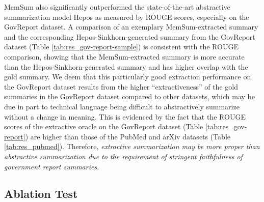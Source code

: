 \documentclass[11pt]{article}
\begin{document}
MemSum also significantly outperformed the state-of-the-art abstractive summarization model Hepos as measured by ROUGE scores, especially on the GovReport dataset.
A comparison of an exemplary MemSum-extracted summary and the corresponding Hepos-Sinkhorn-generated summary from the GovReport dataset (Table \ref{tab:res_gov-report-sample}) is consistent with the ROUGE comparison, showing that the MemSum-extracted summary is more accurate than the Hepos-Sinkhorn-generated summary and has higher overlap with the gold summary. 
We deem that this particularly good extraction performance on the GovReport dataset results from the higher ``extractiveness'' of the gold summaries in the GovReport dataset compared to other datasets, which may be due in part to technical language being difficult to abstractively summarize without a change in meaning. This is evidenced by the fact that the ROUGE scores of the extractive oracle on the GovReport dataset (Table \ref{tab:res_gov-report}) are higher than those of the PubMed and arXiv datasets (Table \ref{tab:res_pubmed}).
Therefore, \textit{extractive summarization may be more proper than abstractive summarization due to the requirement of stringent faithfulness of government report summaries}.


\subsection{Ablation Test}
\end{document}
